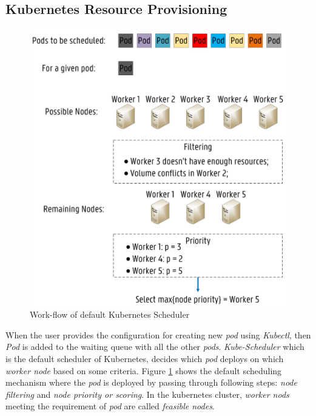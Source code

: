 \subsection{Kubernetes Resource Provisioning}
\label{sec:k8s_scheduler}
\begin{figure}
  \centering
  \includegraphics[width=\linewidth]{figures/mlcn-k8s-scheduler.pdf}
  \caption{Work-flow of default Kubernetes Scheduler\cite{Santos2019}}
  \label{fig:k8s-sch}
\end{figure}
When the user provides the configuration for creating new \emph{pod} using \emph{Kubectl}, then \emph{Pod} is added to the waiting queue with all the other \emph{pods}\cite{Santos2019}. \emph{Kube-Scheduler} which is the default scheduler of Kubernetes, decides which \emph{pod} deploys on which \emph{worker node} based on some criteria. Figure \ref{fig:k8s-sch} shows the default scheduling mechanism where the \emph{pod} is deployed by passing through following steps: \emph{node filtering} and \emph{node priority or scoring}\cite{Santos2019}. In the kubernetes cluster, \emph{worker nods} meeting the requirement of \emph{pod} are called \emph{feasible nodes}\cite{k8s}.
